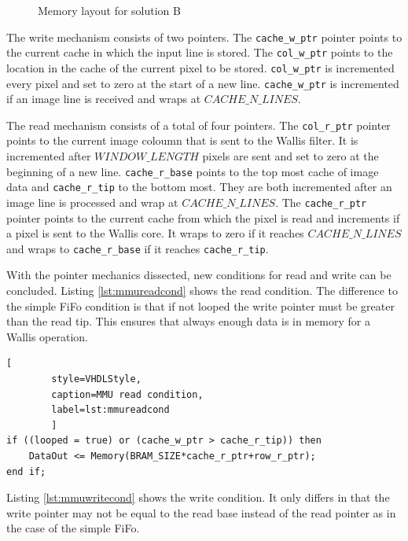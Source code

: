 \begin{figure}[tb!]
    \centering
    \begin{adjustbox}{max width=\textwidth}
        
    \end{adjustbox}
    \caption{Memory layout for solution B}
    \label{fig:solbmemlayout}
\end{figure}

The write mechanism consists of two pointers. The \texttt{cache\_w\_ptr} pointer
points to the current cache in which the input line is stored. The 
\texttt{col\_w\_ptr} points to the location in the cache of the current pixel to
be stored. \texttt{col\_w\_ptr} is incremented every pixel and set to zero at
the start of a new line. \texttt{cache\_w\_ptr} is incremented if an image line
is received and wraps at $CACHE\_N\_LINES$.

The read mechanism consists of a total of four pointers. The \texttt{col\_r\_ptr}
pointer points to the current image coloumn that is sent to the Wallis filter.
It is incremented after $WINDOW\_LENGTH$ pixels are sent and set to zero at
the beginning of a new line. \texttt{cache\_r\_base} points to the top most
cache of image
data and \texttt{cache\_r\_tip} to the bottom most. They are both incremented
after an image line is processed and wrap at $CACHE\_N\_LINES$. The 
\texttt{cache\_r\_ptr} pointer points to the current cache from which the pixel
is read and increments if a pixel is sent to the Wallis core. It wraps to zero
if it reaches $CACHE\_N\_LINES$ and wraps to \texttt{cache\_r\_base} if it
reaches \texttt{cache\_r\_tip}. 

With the pointer mechanics dissected, new conditions for read and write can be
concluded. Listing \ref{lst:mmureadcond} shows the read condition. The
difference to the simple FiFo condition is that if not looped the write pointer
must be greater than the read tip. This ensures that always enough data is in
memory for a Wallis operation.

\begin{minipage}{\linewidth}
    \begin{lstlisting}[
        style=VHDLStyle, 
        caption=MMU read condition, 
        label=lst:mmureadcond
        ]
if ((looped = true) or (cache_w_ptr > cache_r_tip)) then
    DataOut <= Memory(BRAM_SIZE*cache_r_ptr+row_r_ptr);
end if;\end{lstlisting}
\end{minipage}

Listing \ref{lst:mmuwritecond} shows the write condition. It only differs in
that the write pointer may not be equal to the read base instead of the read
pointer as in the case of the simple FiFo.

